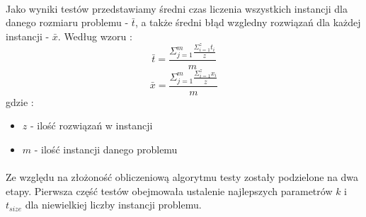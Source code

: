 \documentclass[wide,a4paper,titlepage,12pt] {article}
\begin{document}
\paragraph{}
Jako wyniki testów przedstawiamy średni czas liczenia wszystkich instancji dla danego rozmiaru problemu - $\bar{t}$, a także średni błąd wzgledny  rozwiązań dla każdej instancji - $\bar{x}$. Według wzoru : \\
\begin{equation}
    \bar{t} = \frac{\Sigma_{j=1}^{m}\frac{\Sigma_{i=1}^{z}t_{i}}{z}}{m}
\end{equation}
\begin{equation}
    \bar{x} = \frac{\Sigma_{j=1}^{m}\frac{\Sigma_{i=1}^{z}x_{i}}{z}}{m}
\end{equation}
gdzie : \\
\begin{itemize}
  \item $z$ - ilość rozwiązań w instancji
  \item $m$ - ilość instancji danego problemu
\end{itemize}
\paragraph{}
Ze względu na złożoność obliczeniową algorytmu testy zostały podzielone na dwa etapy.
Pierwsza część testów obejmowała ustalenie najlepszych parametrów $k$ i $t_{size}$ dla niewielkiej liczby instancji problemu.
\newpage
\end{document}
